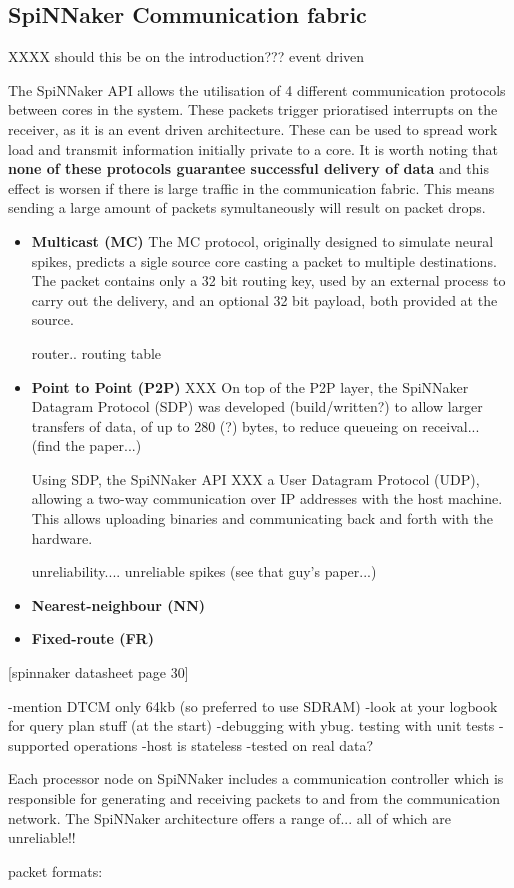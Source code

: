 \subsection{SpiNNaker Communication fabric}

XXXX should this be on the introduction???
event driven

The SpiNNaker API allows the utilisation of 4 different communication protocols between cores in the system. These packets trigger prioratised interrupts on the receiver, as it is an event driven architecture. These can be used to spread work load and transmit information initially private to a core.
It is worth noting that \textbf{none of these protocols guarantee successful delivery of data} and this effect is worsen if there is large traffic in the communication fabric. This means sending a large amount of packets symultaneously will result on packet drops.

\begin{itemize}
\item \textbf{Multicast (MC)}
The MC protocol, originally designed to simulate neural spikes, predicts a sigle source core casting a packet to multiple destinations. The packet contains only a 32 bit routing key, used by an external process to carry out the delivery, and an optional 32 bit payload, both provided at the source.

router.. routing table
\item \textbf{Point to Point (P2P)}
XXX
On top of the P2P layer, the SpiNNaker Datagram Protocol (SDP) was developed (build/written?) to allow larger transfers of data, of up to 280 (?) bytes, to reduce queueing on receival... (find the paper...)

Using SDP, the SpiNNaker API XXX a User Datagram Protocol (UDP), allowing a two-way communication over IP addresses with the host machine. This allows uploading binaries and communicating back and forth with the hardware.

unreliability....
unreliable spikes (see that guy's paper...)

\item \textbf{Nearest-neighbour (NN)}
\item \textbf{Fixed-route (FR)}
\end{itemize}

[spinnaker datasheet page 30]

-mention DTCM only 64kb (so preferred to use SDRAM)
-look at your logbook for query plan stuff (at the start)
-debugging with ybug. testing with unit tests
-supported operations
-host is stateless
-tested on real data?

Each processor node on SpiNNaker includes a communication controller which is responsible for generating and receiving packets to and from the communication network.
The SpiNNaker architecture offers a range of...
all of which are unreliable!!

packet formats:


